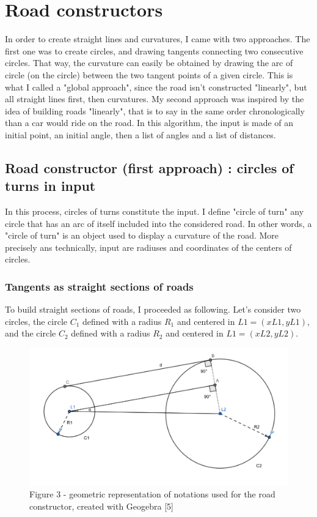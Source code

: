 \documentclass[a4paper,12pt,fleqn]{article}
\begin{document}
\section{Road constructors}

In order to create straight lines and curvatures, I came with two approaches. The first one was to create circles, and drawing tangents connecting two consecutive circles. That way, the curvature can easily be obtained by drawing the arc of circle (on the circle) between the two tangent points of a given circle. This is what I called a "global approach", since the road isn't constructed "linearly", but all straight lines first, then curvatures. My second approach was inspired by the idea of building roads "linearly", that is to say in the same order chronologically than a car would ride on the road. In this algorithm, the input is made of an initial point, an initial angle, then a list of angles and a list of distances.

\subsection{Road constructor (first approach) : circles of turns in input}

In this process, circles of turns constitute the input. I define "circle of turn" any circle that has an arc of itself included into the considered road. In other words, a "circle of turn" is an object used to display a curvature of the road. More precisely ans technically, input are radiuses and coordinates of the centers of circles. 

\subsubsection{Tangents as straight sections of roads}

To build straight sections of roads, I proceeded as following. Let's consider two circles, the circle \mbox{$C_1$} defined with a radius \mbox{$R_1$} and centered in \mbox{$L1 = (xL1, yL1)$}, and the circle \mbox{$C_2$} defined with a radius \mbox{$R_2$} and centered in \mbox{$L1 = (xL2, yL2)$}.

\begin{figure}[H]
\centering
\includegraphics[width=\textwidth]{roadConstructor}
Figure 3 -  geometric representation of notations used for the road constructor, created with Geogebra [5]
\end{figure}
\end{document}

